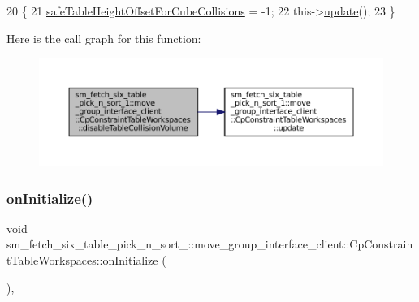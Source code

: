 \begin{DoxyCode}
20         \{
21             \hyperlink{classsm__fetch__six__table__pick__n__sort__1_1_1move__group__interface__client_1_1CpConstraintTableWorkspaces_a3fb4f4deb8a694ff797af6336e74444e}{safeTableHeightOffsetForCubeCollisions} = -1;
22             this->\hyperlink{classsm__fetch__six__table__pick__n__sort__1_1_1move__group__interface__client_1_1CpConstraintTableWorkspaces_a2588601a0f45af921e1864f8ba765c51}{update}();
23         \}
\end{DoxyCode}
Here is the call graph for this function\+:
\nopagebreak
\begin{figure}[H]
\begin{center}
\leavevmode
\includegraphics[width=350pt]{classsm__fetch__six__table__pick__n__sort__1_1_1move__group__interface__client_1_1CpConstraintTableWorkspaces_a5aa2a5b0a497246799e2d4774e2a3ad8_cgraph}
\end{center}
\end{figure}
\mbox{\label{classsm__fetch__six__table__pick__n__sort__1_1_1move__group__interface__client_1_1CpConstraintTableWorkspaces_a07f404b48f6e94f9cdf0a01eef460d64}} 
\subsubsection{\texorpdfstring{on\+Initialize()}{onInitialize()}}
{\footnotesize\ttfamily void sm\+\_\+fetch\+\_\+six\+\_\+table\+\_\+pick\+\_\+n\+\_\+sort\+\_\+::move\+\_\+group\+\_\+interface\+\_\+client\+::\+Cp\+Constraint\+Table\+Workspaces\+::on\+Initialize (\begin{DoxyParamCaption}{ }\end{DoxyParamCaption})\hspace{0.3cm}{\ttfamily [override]}, {\ttfamily [virtual]}}



